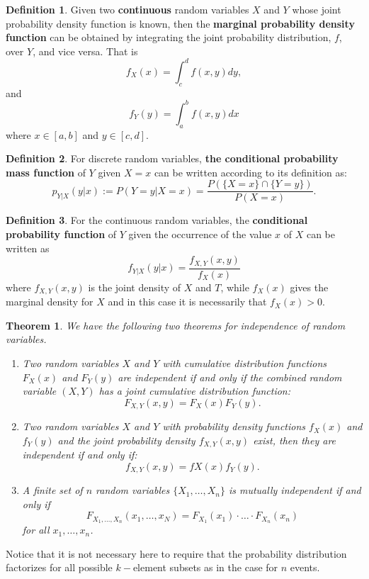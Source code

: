 \documentclass[11pt,a4paper]{amsart}
\theoremstyle{plain}
\newtheorem{theorem}{Theorem}
\theoremstyle{definition}
\newtheorem{definition}{Definition}
\begin{document}
	\begin{definition}
		Given two \textbf{continuous} random variables $X$ and $Y$ whose joint probability density function is known, then the \textbf{marginal probability density function} can be obtained by integrating the joint probability distribution, $f$, over $Y$, and vice versa. That is 
		\[	f_{X}(x) = \int_{c}^{d} f(x,y)dy,	\]
		and
		\[	f_{Y}(y) = \int_{a}^{b} f(x,y)dx	\]
		where $x \in [a,b]$ and $y \in [c,d]$.
	\end{definition}

	\begin{definition}
		For discrete random variables,\textbf{ the conditional probability mass function} of $Y$ given $X=x$ can be written according to its definition as: 
		\[	p_{Y | X} (y | x) := P(Y = y | X = x) = \frac{P(\{X = x\} \cap \{Y = y\})}{P(X = x)}.	\]
	\end{definition}

	\begin{definition}
		For the continuous  random variables, the \textbf{conditional probability function} of $Y$ given the occurrence of the value $x$ of $X$ can be written as 
		\[	f_{Y | X} (y | x) = \frac{f_{X,Y}(x,y)}{f_{X}(x)}	\]
		where $f_{X,Y}(x,y)$ is the joint density of $X$ and $T$, while $f_{X}(x)$ gives the marginal density for $X$ and in this case it is necessarily that $f_{X}(x) > 0$. 
	\end{definition}

	
	\begin{theorem}
		We have the following two theorems for independence of random variables.
		\begin{enumerate}\label{t: inde of random variables}
			\item Two random variables $X$ and $Y$ with cumulative distribution functions $F_{X}(x)$ and $F_{Y}(y)$ are independent if and only if the combined random variable $(X,Y)$ has a joint cumulative distribution function:
			\[	F_{X,Y} (x,y) = F_{X}(x)F_{Y}(y).	\]
			\item Two random variables $X$ and $Y$ with probability density functions $f_{X}(x)$ and $f_{Y}(y)$ and the joint probability density $f_{X,Y}(x,y)$ exist, then they are independent if and only if:
			\[	f_{X,Y} (x,y) = f{X}(x)f_{Y}(y).	\]
			\item A finite set of $n$ random variables $\{X_{1}, \dots, X_{n}\}$ is mutually independent if and only if 
			\[	F_{X_{1}, \dots, X_{n}} (x_{1}, \dots, x_{N}) = F_{X_{1}}(x_{1}) \cdot \dots \cdot F_{X_{n}}(x_{n})	\] for all $x_{1}, \dots, x_{n}$.
		\end{enumerate}
	\end{theorem}
	Notice that it is not necessary here to require that the probability distribution factorizes for all possible $k-$element subsets as in the case for $n$ events. 
	
\end{document}
